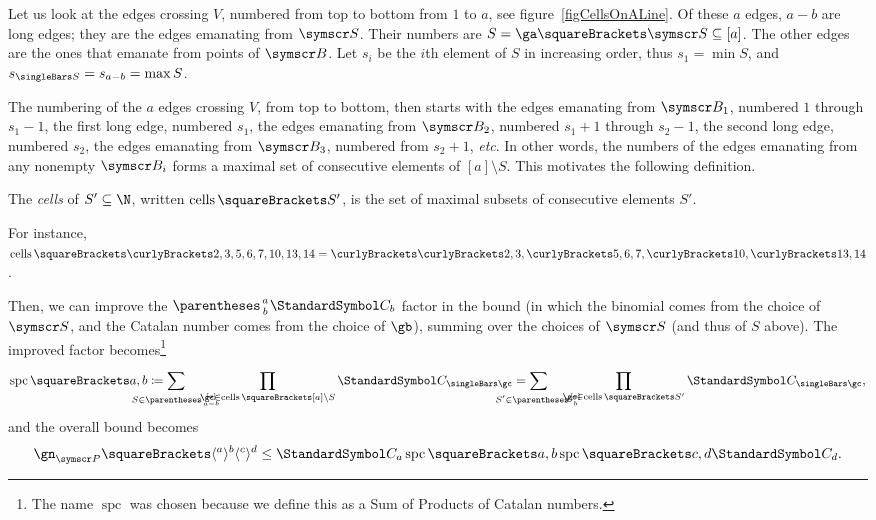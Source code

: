 \documentclass[10pt, a4paper, twoside]{basestyle}
\newcommand{\etc}{\emph{etc}}
\DeclareMathOperator{\cells}{cells}
\DeclareMathOperator{\spc}{spc}
\newcommand{\CatalanNumber}[1]{\StandardSymbol C_{#1}}
\newcommand{\pointset}{\symscr}
\begin{document}
Let us look at the edges crossing $V$, numbered from top to bottom from $1$ to $a$, see
figure~\ref{figCellsOnALine}. Of these $a$ edges,
$a-b$ are long edges; they are the edges emanating from $\pointset S$. 
Their numbers are $S = \ga\of{\pointset S} \Subset [a]$.
The other edges are the ones that emanate from points of $\pointset B$.
Let $s_i$ be the $i$th element of $S$ in increasing order, thus $s_1=\min S$, and
$s_{\Cardinality S} = s_{a-b} = \max S$.

The numbering of the $a$ edges crossing $V$, from top to bottom, then starts with
the edges emanating from $\pointset B_1$, numbered $1$ through
$s_1-1$, the first long edge, numbered $s_1$, the edges emanating from
$\pointset B_2$, numbered $s_1+1$ through $s_2-1$, the second long edge,
numbered $s_2$, the edges emanating from $\pointset B_3$, numbered from $s_2+1$, \etc.
In other words, the numbers of the edges emanating from any nonempty $\pointset B_i$ forms
a maximal set of consecutive elements of $[a]\setminus S$. This motivates the following
definition.

\begin{definition}
The \emph{cells} of $S'\Subset \N$, written $\cells\of{S'}$, is the set of maximal subsets of
consecutive elements $S'$.
\end{definition}
For instance, $\cells\of{\set{2,3,5,6,7,10,13,14}}=\set{\set{2,3},\set{5,6,7},\set{10},\set{13,14}}$.

Then, we can improve the $\binom a b \CatalanNumber b$ factor in the bound (in which the binomial comes from
the choice of $\pointset S$, and the Catalan number comes
from the choice of $\gb$), summing over the choices of $\pointset S$ (and thus of $S$ above).
The improved factor becomes\footnote{The name $\spc$ was chosen because we define this as
a Sum of Products of Catalan numbers.}\begin{equation}
\spc\of{a,b}\DefineAs
\sum{S\in\binom{[a]}{a-b}} \quad \prod{\gc\in\cells\of{[a] \setminus S}}\CatalanNumber {\Cardinality \gc} =
\sum{S'\in\binom{[a]}{b}} \quad \prod{\gc\in\cells\of{S'}}\CatalanNumber {\Cardinality \gc}\text,
\label{spcDefinition}
\end{equation}
and the overall bound becomes\begin{equation}
\gn_{\pointset P}\of{\langle^a\rangle^b\langle^c\rangle^d}\leq
\CatalanNumber a\spc\of{a, b}\spc\of{c, d}\CatalanNumber d\text.\label{bound-ck-spckl-spcpq-cp}
\end{equation}
\end{document}
